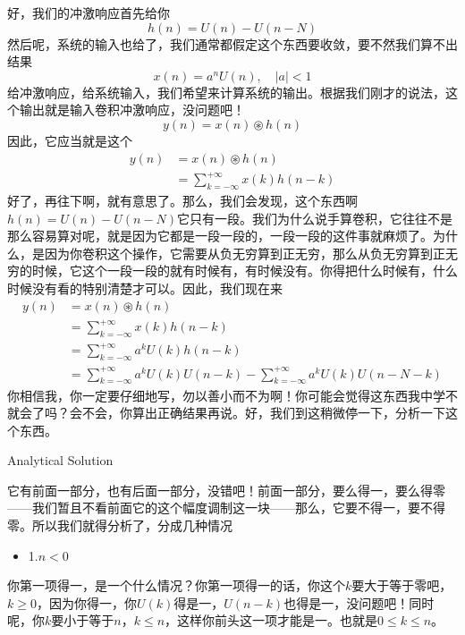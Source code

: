\documentclass[a4paper,12pt]{article}
\begin{document}
好，我们的冲激响应首先给你
\begin{equation}
   h(n) = U(n) - U(n-N)
\end{equation}
然后呢，系统的输入也给了，我们通常都假定这个东西要收敛，要不然我们算不出结果
\begin{equation}
   x(n) = a^nU(n),\quad \left | a \right | <1
\end{equation}
给冲激响应，给系统输入，我们希望来计算系统的输出。根据我们刚才的说法，这个输出就是输入卷积冲激响应，没问题吧！
\begin{equation}
   y(n) = x(n)\circledast h(n)
\end{equation}
因此，它应当就是这个
\begin{equation}
\begin{aligned}
   y(n) &= x(n)\circledast h(n)\\
	&=\sum_{k=-\infty}^{+\infty}x(k)h(n-k)
\end{aligned}
\end{equation}
好了，再往下啊，就有意思了。那么，我们会发现，这个东西啊$h(n) = U(n) - U(n-N)$它只有一段。我们为什么说手算卷积，它往往不是那么容易算对呢，就是因为它都是一段一段的，一段一段的这件事就麻烦了。为什么，是因为你卷积这个操作，它需要从负无穷算到正无穷，那么从负无穷算到正无穷的时候，它这个一段一段的就有时候有，有时候没有。你得把什么时候有，什么时候没有看的特别清楚才可以。因此，我们现在来
\begin{equation}
\begin{aligned}
   y(n) &= x(n)\circledast h(n)\\
	&=\sum_{k=-\infty}^{+\infty}x(k)h(n-k)\\
   &=\sum_{k=-\infty}^{+\infty}a^kU(k)h(n-k)\\
	&=\sum_{k=-\infty}^{+\infty}a^kU(k)U(n-k) - \sum_{k=-\infty}^{+\infty}a^kU(k)U(n-N-k)
\end{aligned}
\end{equation}
你相信我，你一定要仔细地写，勿以善小而不为啊！你可能会觉得这东西我中学不就会了吗？会不会，你算出正确结果再说。好，我们到这稍微停一下，分析一下这个东西。

Analytical Solution

它有前面一部分，也有后面一部分，没错吧！前面一部分，要么得一，要么得零——我们暂且不看前面它的这个幅度调制这一块——那么，它要不得一，要不得零。所以我们就得分析了，分成几种情况
\begin{itemize}
    \item 1.\quad$n<0$
\end{itemize}

你第一项得一，是一个什么情况？你第一项得一的话，你这个$k$要大于等于零吧，$k\ge 0$，因为你得一，你$U(k)$得是一，$U(n-k)$也得是一，没问题吧！同时呢，你$k$要小于等于$n$，$k\le n$，这样你前头这一项才能是一。也就是$0 \le k \le n$。
\end{document}

